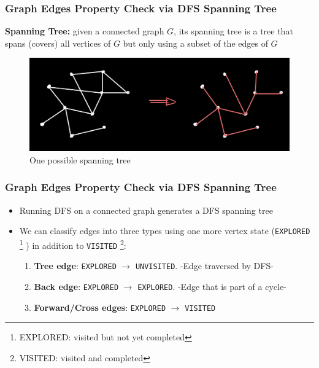 \documentclass{beamer}
\begin{document}
\begin{frame}[fragile]
\frametitle{Graph Edges Property Check via DFS Spanning Tree}

\textbf{Spanning Tree:} given a connected graph $G$, its spanning tree is a tree that spans (covers) all vertices of $G$ but only using a subset of the edges of $G$

\begin{figure}[H]
    \centering
    \includegraphics[scale=0.15]{imgs/spanning_tree.jpeg}
    \caption{One possible spanning tree}
\end{figure}

\end{frame}


\begin{frame}[fragile]
\frametitle{Graph Edges Property Check via DFS Spanning Tree}

\begin{itemize}
    \item Running DFS on a connected graph generates a DFS spanning tree
    \pause
    \item We can classify edges into three types using one more vertex state (\verb|EXPLORED| \footnote{EXPLORED: visited but not yet completed} ) in addition to \verb|VISITED| \footnote{VISITED: visited and completed}: 
    	\pause
    	\vspace{0.3cm}
    	\begin{enumerate}
		    \item \textbf{Tree edge}: \verb|EXPLORED| $\rightarrow$ \verb|UNVISITED|. \color{titleColor} -Edge traversed by DFS- \color{fontColor}
		    \pause
		    \item \textbf{Back edge}: \verb|EXPLORED| $\rightarrow$ \verb|EXPLORED|. \color{titleColor} -Edge that is part of a cycle-\color{fontColor}
		    \pause
		    \item \textbf{Forward/Cross edges}: \verb|EXPLORED| $\rightarrow$ \verb|VISITED|
		\end{enumerate}
\end{itemize}

\end{frame}
\end{document}
